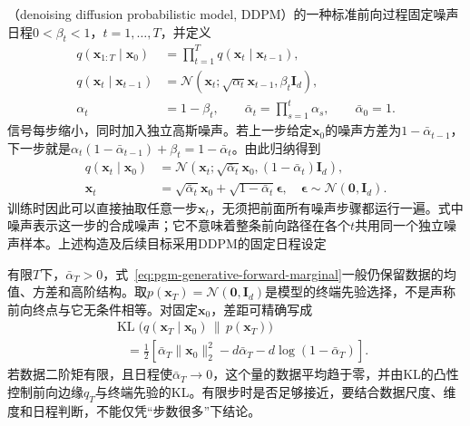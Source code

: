（denoising diffusion probabilistic model, DDPM）的一种标准前向过程固定噪声日程$0<\beta_t<1$，$t=1,\ldots,T$，并定义
\begin{equation}
  \label{eq:pgm-generative-forward-chain}
  \begin{aligned}
    q(\bm{x}_{1:T}\mid\bm{x}_0)
      &=\prod_{t=1}^{T}q(\bm{x}_t\mid\bm{x}_{t-1}),\\
    q(\bm{x}_t\mid\bm{x}_{t-1})
      &=\mathcal{N}(\bm{x}_t;
          \sqrt{\alpha_t}\bm{x}_{t-1},\beta_t\bm{I}_d),\\
    \alpha_t&=1-\beta_t,\qquad
    \bar{\alpha}_t=\prod_{s=1}^{t}\alpha_s,\qquad
    \bar{\alpha}_0=1.
  \end{aligned}
\end{equation}
信号每步缩小，同时加入独立高斯噪声。若上一步给定$\bm{x}_0$的噪声方差为$1-\bar{\alpha}_{t-1}$，下一步就是$\alpha_t(1-\bar{\alpha}_{t-1})+\beta_t=1-\bar{\alpha}_t$。由此归纳得到
\begin{equation}
  \label{eq:pgm-generative-forward-marginal}
  \begin{aligned}
    q(\bm{x}_t\mid\bm{x}_0)
      &=\mathcal{N}(\bm{x}_t;
          \sqrt{\bar{\alpha}_t}\bm{x}_0,
          (1-\bar{\alpha}_t)\bm{I}_d),\\
    \bm{x}_t&=\sqrt{\bar{\alpha}_t}\bm{x}_0+
              \sqrt{1-\bar{\alpha}_t}\bm{\epsilon},
    \quad \bm{\epsilon}\sim\mathcal{N}(\bm{0},\bm{I}_d).
  \end{aligned}
\end{equation}
训练时因此可以直接抽取任意一步$\bm{x}_t$，无须把前面所有噪声步骤都运行一遍。式中噪声表示这一步的合成噪声；它不意味着整条前向路径在各个$t$共用同一个独立噪声样本。上述构造及后续目标采用DDPM的固定日程设定

有限$T$下，$\bar{\alpha}_T>0$，式~\eqref{eq:pgm-generative-forward-marginal}一般仍保留数据的均值、方差和高阶结构。取$p(\bm{x}_T)=\mathcal{N}(\bm{0},\bm{I}_d)$是模型的终端先验选择，不是声称前向终点与它无条件相等。对固定$\bm{x}_0$，差距可精确写成
\begin{equation}
  \label{eq:pgm-generative-terminal-kl}
  \begin{aligned}
    &\operatorname{KL}\bigl(
        q(\bm{x}_T\mid\bm{x}_0)\,\|\,p(\bm{x}_T)\bigr)\\
    &\quad=\frac12\left[
       \bar{\alpha}_T\lVert\bm{x}_0\rVert_2^2
       -d\bar{\alpha}_T-d\log(1-\bar{\alpha}_T)
      \right].
  \end{aligned}
\end{equation}
若数据二阶矩有限，且日程使$\bar{\alpha}_T\to0$，这个量的数据平均趋于零，并由KL的凸性控制前向边缘$q_T$与终端先验的KL。有限步时是否足够接近，要结合数据尺度、维度和日程判断，不能仅凭“步数很多”下结论。

